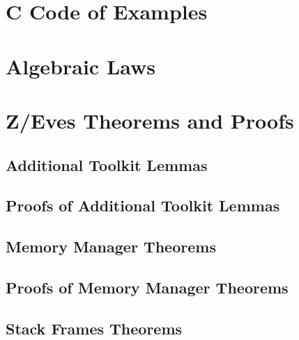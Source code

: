 \documentclass[a4paper,11pt]{report}
\begin{document}
\begin{refsection}
\chapter{C Code of Examples}
\label{example-c-code-appendix}



\chapter{Algebraic Laws}
\label{algebraic-laws-appendix}



\chapter{Z/Eves Theorems and Proofs}
\label{zeves-proofs}

\section{Additional Toolkit Lemmas}
\label{additional-lemmas}
\normalsize

 

\section{Proofs of Additional Toolkit Lemmas}
\label{additional-lemmas-proofs}
\scriptsize





\section{Memory Manager Theorems}
\label{memory-manager-theorems}
\normalsize



\section{Proofs of Memory Manager Theorems}
\label{memory-manager-proofs}
\scriptsize



\section{Stack Frames Theorems}
\label{stack-frames-theorems-appendix}


\end{refsection}
\end{document}
